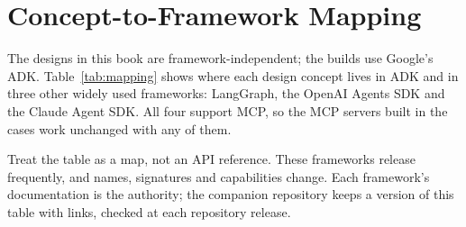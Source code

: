 
\chapter{Concept-to-Framework Mapping}
\label{app:mapping}

The designs in this book are framework-independent; the builds use Google's ADK. Table~\ref{tab:mapping} shows where each design concept lives in ADK and in three other widely used frameworks: LangGraph, the OpenAI Agents SDK and the Claude Agent SDK. All four support MCP, so the MCP servers built in the cases work unchanged with any of them.

Treat the table as a map, not an API reference. These frameworks release frequently, and names, signatures and capabilities change. Each framework's documentation is the authority; the companion repository keeps a version of this table with links, checked at each repository release.

